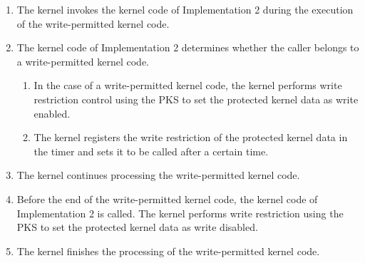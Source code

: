 \begin{enumerate}[topsep=0pt]%
\item The kernel invokes the kernel code of Implementation 2 during the execution of the write-permitted kernel code.
  
\item The kernel code of Implementation 2 determines whether the caller belongs to a write-permitted kernel code.

\begin{enumerate}[topsep=0pt]%
\item In the case of a write-permitted kernel code, the kernel performs write restriction control using the PKS to set the protected kernel data as write enabled.
\item The kernel registers the write restriction of the protected kernel data in the timer and sets it to be called after a certain time.
      
\end{enumerate}
  
\item The kernel continues processing the write-permitted kernel code.
\item Before the end of the write-permitted kernel code, the kernel code of
Implementation 2 is called. The kernel performs write restriction using the PKS to set the
protected kernel data as write disabled.
\item The kernel finishes the processing of the write-permitted kernel code.

\end{enumerate}

